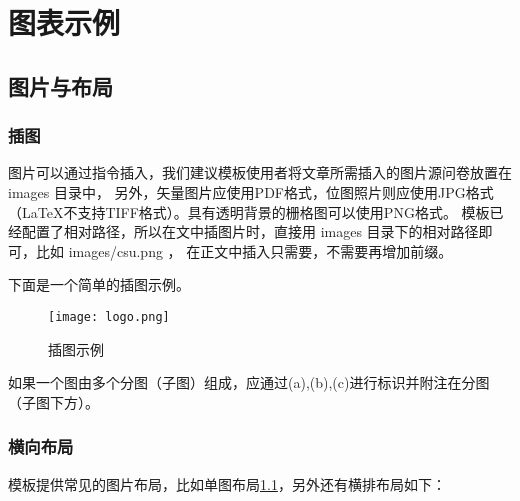 %
%
%
%
%

\chapter{图表示例}

\section{图片与布局}

\subsection{插图}

图片可以通过指令插入，我们建议模板使用者将文章所需插入的图片源问卷放置在 images 目录中，
另外，矢量图片应使用PDF格式，位图照片则应使用JPG格式（LaTeX不支持TIFF格式）。具有透明背景的栅格图可以使用PNG格式。
模板已经配置了相对路径，所以在文中插图片时，直接用 images 目录下的相对路径即可，比如 images/csu.png ，
在正文中插入只需要，不需要再增加前缀。

下面是一个简单的插图示例。

\begin{figure}[hbt]
    \centering
    \texttt{[image: logo.png]}
    \caption{插图示例}
    \label{f.example}
\end{figure}


如果一个图由多个分图（子图）组成，应通过(a),(b),(c)进行标识并附注在分图（子图下方）。

\subsection{横向布局}

模板提供常见的图片布局，比如单图布局\ref{f.example}，另外还有横排布局如下：


